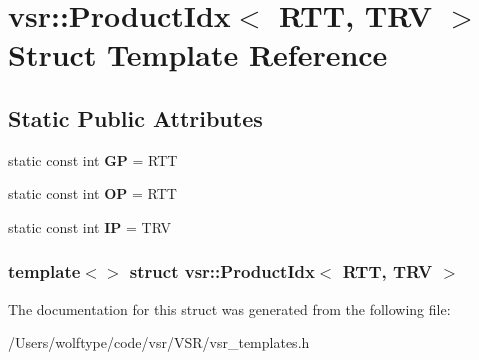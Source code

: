 \hypertarget{structvsr_1_1_product_idx_3_01_r_t_t_00_01_t_r_v_01_4}{\section{vsr\-:\-:Product\-Idx$<$ R\-T\-T, T\-R\-V $>$ Struct Template Reference}
\label{structvsr_1_1_product_idx_3_01_r_t_t_00_01_t_r_v_01_4}
}
\subsection*{Static Public Attributes}
\begin{DoxyCompactItemize}
\item 
\hypertarget{structvsr_1_1_product_idx_3_01_r_t_t_00_01_t_r_v_01_4_a077c871439caa4bb0f0a4b513de71faa}{static const int {\bfseries G\-P} = R\-T\-T}\label{structvsr_1_1_product_idx_3_01_r_t_t_00_01_t_r_v_01_4_a077c871439caa4bb0f0a4b513de71faa}

\item 
\hypertarget{structvsr_1_1_product_idx_3_01_r_t_t_00_01_t_r_v_01_4_aaf758b4bb84c9ae208c98f621598509e}{static const int {\bfseries O\-P} = R\-T\-T}\label{structvsr_1_1_product_idx_3_01_r_t_t_00_01_t_r_v_01_4_aaf758b4bb84c9ae208c98f621598509e}

\item 
\hypertarget{structvsr_1_1_product_idx_3_01_r_t_t_00_01_t_r_v_01_4_a7fcdf87f7ebf65d937f9780f09c7578e}{static const int {\bfseries I\-P} = T\-R\-V}\label{structvsr_1_1_product_idx_3_01_r_t_t_00_01_t_r_v_01_4_a7fcdf87f7ebf65d937f9780f09c7578e}

\end{DoxyCompactItemize}
\subsubsection*{template$<$$>$ struct vsr\-::\-Product\-Idx$<$ R\-T\-T, T\-R\-V $>$}



The documentation for this struct was generated from the following file\-:\begin{DoxyCompactItemize}
\item 
/\-Users/wolftype/code/vsr/\-V\-S\-R/vsr\-\_\-templates.\-h\end{DoxyCompactItemize}
